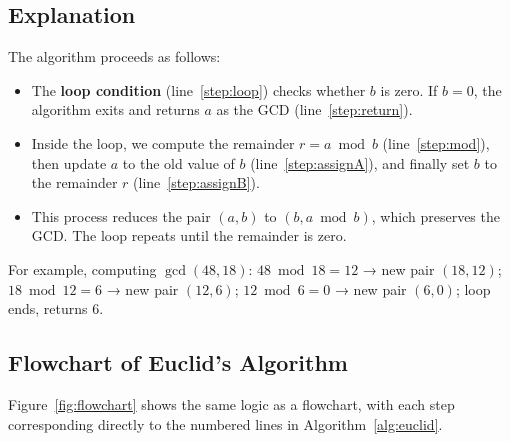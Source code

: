 \documentclass[12pt]{article}
\begin{document}
\subsection{Explanation}

The algorithm proceeds as follows:
\begin{itemize}
	\item The \textbf{loop condition} (line~\ref{step:loop}) checks whether \(b\) is zero. If \(b=0\), the algorithm exits and returns \(a\) as the GCD (line~\ref{step:return}).
	\item Inside the loop, we compute the remainder \(r = a \bmod b\) (line~\ref{step:mod}), then update \(a\) to the old value of \(b\) (line~\ref{step:assignA}), and finally set \(b\) to the remainder \(r\) (line~\ref{step:assignB}).
	\item This process reduces the pair \((a,b)\) to \((b, a \bmod b)\), which preserves the GCD. The loop repeats until the remainder is zero.
\end{itemize}

For example, computing \(\gcd(48, 18)\):  
\(48 \bmod 18 = 12\) → new pair \((18,12)\);  
\(18 \bmod 12 = 6\) → new pair \((12,6)\);  
\(12 \bmod 6 = 0\) → new pair \((6,0)\); loop ends, returns \(6\).
\newpage
\subsection{Flowchart of Euclid's Algorithm}

Figure~\ref{fig:flowchart} shows the same logic as a flowchart, with each step corresponding directly to the numbered lines in Algorithm~\ref{alg:euclid}.
\end{document}
